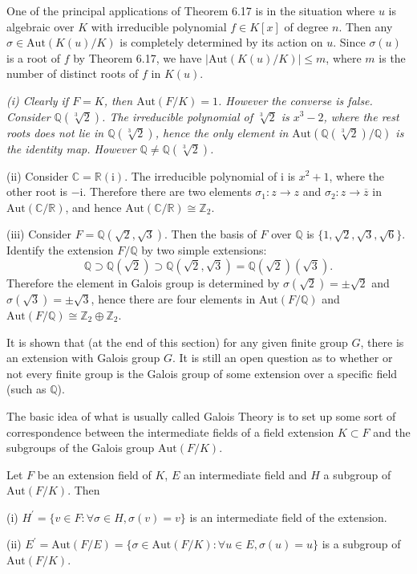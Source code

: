 One of the principal applications of Theorem 6.17 is in the situation where $u$ is algebraic over $K$ with irreducible polynomial $f\in K[x]$ of degree $n$. Then any $\sigma\in\mathrm{Aut}(K(u)/K)$ is completely determined by its action on $u$. Since $\sigma(u)$ is a root of $f$ by Theorem 6.17, we have $|\mathrm{Aut}(K(u)/K)|\le m$, where $m$ is the number of distinct roots of $f$ in $K(u)$.
\begin{example}\em
(i) Clearly if $F=K$, then $\mathrm{Aut}(F/K)=1$. However the converse is false. Consider $\mathbb{Q}(\sqrt[3]{2})$. The irreducible polynomial of $\sqrt[3]{2}$ is $x^3-2$, where the rest roots does not lie in $\mathbb{Q}(\sqrt[3]{2})$, hence the only element in $\mathrm{Aut}(\mathbb{Q}(\sqrt[3]{2})/\mathbb{Q})$ is the identity map. However $\mathbb{Q}\ne\mathbb{Q}(\sqrt[3]{2})$.\par
(ii) Consider $\mathbb{C}=\mathbb{R}(\mathrm{i})$. The irreducible polynomial of $\mathrm{i}$ is $x^2+1$, where the other root is $-\mathrm{i}$. Therefore there are two elements $\sigma_1:z\to z$ and $\sigma_2:z\to\overline{z}$ in $\mathrm{Aut}(\mathbb{C}/\mathbb{R})$, and hence $\mathrm{Aut}(\mathbb{C}/\mathbb{R})\cong\mathbb{Z}_2$.\par
(iii) Consider $F=\mathbb{Q}(\sqrt{2},\sqrt{3})$. Then the basis of $F$ over $\mathbb{Q}$ is $\{1,\sqrt{2},\sqrt{3},\sqrt{6}\}$. Identify the extension $F/\mathbb{Q}$ by two simple extensions: 
$$
\mathbb{Q} \supset \mathbb{Q} \left( \sqrt{2} \right) \supset \mathbb{Q} \left( \sqrt{2},\sqrt{3} \right) =\mathbb{Q} \left( \sqrt{2} \right) \left( \sqrt{3} \right) .
$$
Therefore the element in Galois group is determined by $\sigma(\sqrt{2})=\pm\sqrt{2}$ and $\sigma(\sqrt{3})=\pm\sqrt{3}$, hence there are four elements in $\mathrm{Aut}(F/\mathbb{Q})$ and $\mathrm{Aut}(F/\mathbb{Q})\cong\mathbb{Z}_2\oplus\mathbb{Z}_2$.
\end{example}
It is shown that (at the end of this section) for any given finite group $G$, there is an extension with Galois group $G$. It is still an open question as to whether or 
not every finite group is the Galois group of some extension over a specific field 
(such as $\mathbb{Q}$). \par
The basic idea of what is usually called Galois Theory is to set up some sort of correspondence between the intermediate fields of a field extension $K\subset F$ and the subgroups of the Galois group $\mathrm{Aut}(F/K)$.
\begin{theorem}
Let $F$ be an extension field of $K$, $E$ an intermediate field and $H$ a subgroup of $\mathrm{Aut}(F/K)$. Then \par
(i) $H^\prime=\{v\in F:\forall\sigma\in H,\sigma(v)=v\}$ is an intermediate field of the extension.\par
(ii) $E^\prime=\mathrm{Aut}(F/E)=\{\sigma\in\mathrm{Aut}(F/K):\forall u\in E,\sigma(u)=u\}$ is a subgroup of $\mathrm{Aut}(F/K)$.
\end{theorem}
